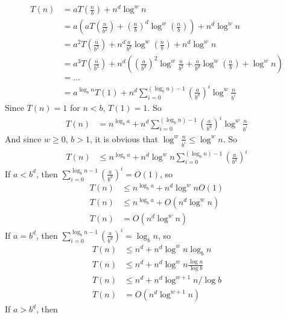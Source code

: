 \documentclass[12pt,letterpaper]{article}
\begin{document}
\section{}
\begin{align}
    T(n)&=aT(\frac{n}{b})+n^d\log^wn\\
    &=a(aT(\frac{n}{b^2})+(\frac{n}{b})^d\log^w(\frac{n}{b}))+n^d\log^wn\\
    &=a^2T(\frac{n}{b^2})+n^d\frac{a}{b^d}\log^w(\frac{n}{b})+n^d\log^wn\\
    &=a^3T(\frac{n}{b^3})+n^d((\frac{a}{b^d})^2\log^w\frac{n}{b^2}+\frac{a}{b^d}\log^w(\frac{n}{b})+\log^wn)\\
    &=\dots\\
    &=a^{\log_bn}T(1)+n^d\sum_{i=0}^{(\log_bn)-1}(\frac{a}{b^d})^i\log^w{\frac{n}{b^i}}
\end{align}
Since $T(n)=1$ for $n<b$, $T(1)=1$. So 
\begin{align}
    T(n)&=n^{\log_ba}+n^d\sum_{i=0}^{(\log_bn)-1}(\frac{a}{b^d})^i\log^w{\frac{n}{b^i}}
\end{align}
And since $w\geq0$, $b>1$, it is obvious that $\log^w\frac{n}{b^i}\leq\log^wn$. So \\
\begin{align}
    T(n)&\leq n^{\log_ba}+n^d\log^wn\sum_{i=0}^{(\log_bn)-1}(\frac{a}{b^d})^i
\end{align}
If $a<b^d$, then $\sum_{i=0}^{\log_bn-1}(\frac{a}{b^d})^i=O(1)$, so
\begin{align}
    T(n)&\leq n^{\log_ba}+n^d\log^wnO(1)\\
    T(n)&\leq n^{\log_ba}+O(n^d\log^wn)\\
    T(n)&=O(n^d\log^wn)
\end{align}
If $a=b^d$, then $\sum_{i=0}^{\log_bn-1}(\frac{a}{b^d})^i=\log_bn$, so
\begin{align}
    T(n)&\leq n^d+n^d\log^wn\log_bn\\
    T(n)&\leq n^d+n^d\log^wn\frac{\log n}{\log b}\\
    T(n)&\leq n^d+n^d\log^{w+1}n/\log b\\
    T(n)&=O(n^d\log^{w+1}n)
\end{align}
If $a>b^d$, then 
\end{document}
